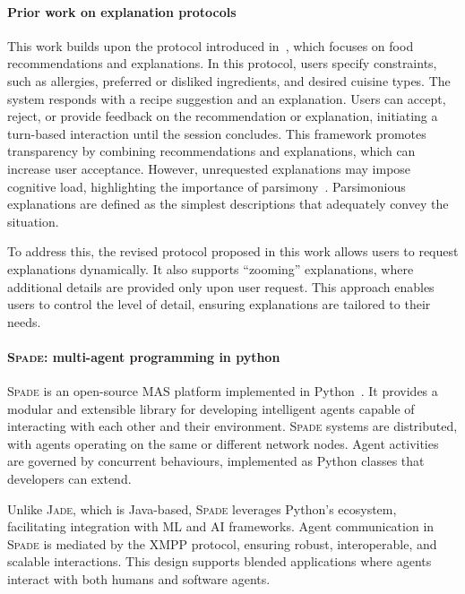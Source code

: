 \paragraph{Prior work on explanation protocols}
%
This work builds upon the protocol introduced in~\cite{citation_needed}, which focuses on food recommendations and explanations.
%
In this protocol, users specify constraints, such as allergies, preferred or disliked ingredients, and desired cuisine types.
%
The system responds with a recipe suggestion and an explanation.
%
Users can accept, reject, or provide feedback on the recommendation or explanation, initiating a turn-based interaction until the session concludes.
%
This framework promotes transparency by combining recommendations and explanations, which can increase user acceptance.
%
However, unrequested explanations may impose cognitive load, highlighting the importance of parsimony~\cite{citation_needed}.
%
Parsimonious explanations are defined as the simplest descriptions that adequately convey the situation.

To address this, the revised protocol proposed in this work allows users to request explanations dynamically.
%
It also supports ``zooming'' explanations, where additional details are provided only upon user request.
%
This approach enables users to control the level of detail, ensuring explanations are tailored to their needs.


\paragraph{\textsc{Spade}: multi-agent programming in python}
%
\textsc{Spade} is an open-source \gls{MAS} platform implemented in Python~\cite{citation_needed}.
%
It provides a modular and extensible library for developing intelligent agents capable of interacting with each other and their environment.
%
\textsc{Spade} systems are distributed, with agents operating on the same or different network nodes.
%
Agent activities are governed by concurrent behaviours, implemented as Python classes that developers can extend.

Unlike \textsc{Jade}, which is Java-based, \textsc{Spade} leverages Python's ecosystem, facilitating integration with \gls{ML} and \gls{AI} frameworks.
%
Agent communication in \textsc{Spade} is mediated by the \gls{XMPP} protocol, ensuring robust, interoperable, and scalable interactions.
%
This design supports blended applications where agents interact with both humans and software agents.

